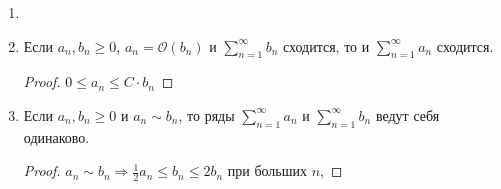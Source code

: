 \begin{corollary}
    \begin{enumerate}
        \item[]
        \item Если $a_n, b_n\geq 0$, $a_n=\mathcal{O}(b_n)$ и $\sum\limits_{n=1}^\infty b_n$ сходится, то и $\sum\limits_{n=1}^\infty a_n$ сходится.

        \begin{proof}
            $0\leq a_n \leq C\cdot b_n$
        \end{proof}
        
        \item Если $a_n, b_n\geq 0$ и $a_n\sim b_n$, то ряды $\sum\limits_{n=1}^\infty a_n$ и $\sum\limits_{n=1}^\infty b_n$ ведут себя одинаково.

        \begin{proof}
            $a_n\sim b_n\Rightarrow \frac{1}{2}a_n\leq b_n\leq 2 b_n$ при больших $n$,
        \end{proof}
    \end{enumerate}
\end{corollary}

